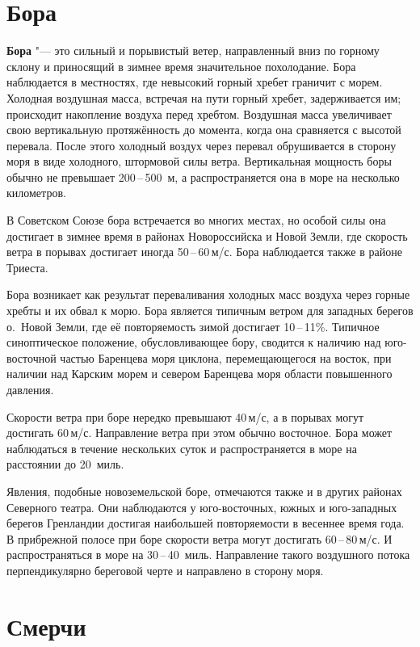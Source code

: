 \documentclass[a4paper, 12pt, twoside, final, book, russian, fittopage, cyremdash, openright]{ncc}
\newcommand{\mps}{\,м/с\xspace}
\newcommand{\otdo}{\,--\,}
\begin{document}
\section{Бора}
\label{sec:bora_wind}

\textbf{Бора} "--- это сильный и порывистый ветер, направленный вниз
по горному склону и приносящий в зимнее время значительное
похолодание. Бора наблюдается в местностях, где невысокий горный
хребет граничит с морем. Холодная воздушная масса, встречая на пути
горный хребет, задерживается им; происходит накопление воздуха перед
хребтом. Воздушная масса увеличивает свою вертикальную протяжённость
до момента, когда она сравняется с высотой перевала. После этого
холодный воздух через перевал обрушивается в сторону моря в виде
холодного, штормовой силы ветра. Вертикальная мощность боры обычно не
превышает 200\otdo500~м, а распространяется она в море на несколько
километров.

В Советском Союзе бора встречается во многих местах, но особой силы
она достигает в зимнее время в районах Новороссийска и Новой Земли,
где скорость ветра в порывах достигает иногда 50\otdo60\mps. Бора
наблюдается также в районе Триеста.

Бора возникает как результат переваливания холодных масс воздуха через
горные хребты и их обвал к морю. Бора является типичным ветром для
западных берегов о.~Новой Земли, где её повторяемость зимой достигает
10\otdo11\%. Типичное синоптическое положение, обусловливающее бору,
сводится к наличию над юго-восточной частью Баренцева моря циклона,
перемещающегося на восток, при наличии над Карским морем и севером
Баренцева моря области повышенного давления.

Скорости ветра при боре нередко превышают 40\mps, а в порывах могут
достигать 60\mps.  Направление ветра при этом обычно восточное. Бора
может наблюдаться в течение нескольких суток и распространяется в море
на расстоянии до 20~миль.

Явления, подобные новоземельской боре, отмечаются также и в других
районах Северного театра. Они наблюдаются у юго-восточных, южных и
юго-западных берегов Гренландии достигая наибольшей повторяемости в
весеннее время года. В прибрежной полосе при боре скорости ветра могут
достигать 60\otdo80\mps. И распространяться в море на
30\otdo40~миль. Направление такого воздушного потока перпендикулярно
береговой черте и направлено в сторону моря.

\section{Смерчи}
\label{sec:tornados}
\end{document}
